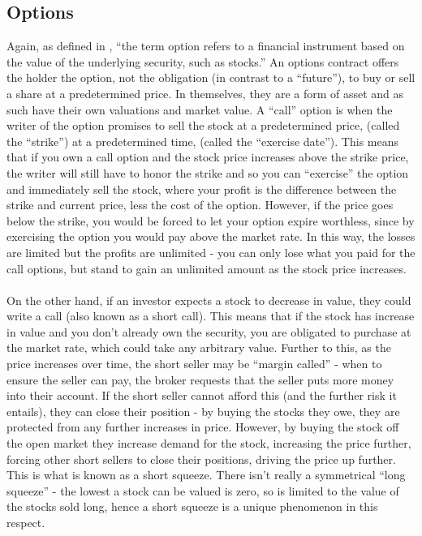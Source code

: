 \documentclass[11pt]{article} %
\begin{document}
\subsection{Options}
Again, as defined in \cite{options}, ``the term option refers to a 
financial instrument based on the value of the underlying security, 
such as stocks.'' An options contract offers the holder the option, 
not the obligation (in contrast to a ``future''), to buy or sell a share 
at a predetermined price. In themselves, they are a form of asset and 
as such have their own valuations and market value. A ``call'' option 
is when the writer of the option promises to sell the stock at a 
predetermined price, (called the ``strike'') at a predetermined time, 
(called the ``exercise date''). This means that if you own a call option and 
the stock price increases above the strike price, the writer will still have 
to honor the strike and so you can ``exercise'' the option 
and immediately sell the stock, where your profit is the difference 
between the strike and current price, less the cost of the option. 
However, if the price goes below the strike, you would be forced 
to let your option expire worthless, since by exercising the option 
you would pay above the market rate. In this way, the losses are limited 
but the profits are unlimited - you can only lose what you paid for the 
call options, but stand to gain an unlimited amount as the stock price 
increases. 
\paragraph{}
On the other hand, if an investor expects a stock to decrease 
in value, they could write a call (also known as a short call). This 
means that if the stock has increase in value and you don't already own 
the security, you are obligated to purchase at the market rate, which 
could take any arbitrary value. Further to this, as the price increases 
over time, the short seller may be ``margin called'' - when to ensure the 
seller can pay, the broker requests that the seller puts more money into 
their account. If the short seller cannot afford this (and the further 
risk it entails), they can close their position - by buying the stocks 
they owe, they are protected from any further increases in price. However, 
by buying the stock off the open market they increase demand for the 
stock, increasing the price further, forcing other short sellers to 
close their positions, driving the price up further. This is what is 
known as a short squeeze. There isn't really a symmetrical ``long 
squeeze'' - the lowest a stock can be valued is zero, so is limited to the 
value of the stocks sold long, hence a short squeeze is a unique phenomenon in 
this respect.
\end{document}

